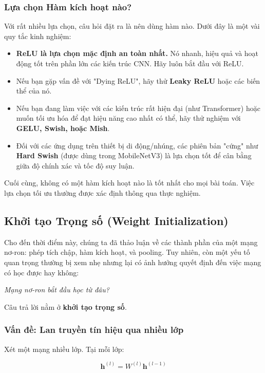 \subsubsection{Lựa chọn Hàm kích hoạt nào?}
Với rất nhiều lựa chọn, câu hỏi đặt ra là nên dùng hàm nào. Dưới đây là một vài quy tắc kinh nghiệm:
\begin{itemize}
	\item \textbf{ReLU là lựa chọn mặc định an toàn nhất.} Nó nhanh, hiệu quả và hoạt động tốt trên phần lớn các kiến trúc CNN. Hãy luôn bắt đầu với ReLU.
	\item Nếu bạn gặp vấn đề với "Dying ReLU", hãy thử \textbf{Leaky ReLU} hoặc các biến thể của nó.
	\item Nếu bạn đang làm việc với các kiến trúc rất hiện đại (như Transformer) hoặc muốn tối ưu hóa để đạt hiệu năng cao nhất có thể, hãy thử nghiệm với \textbf{GELU, Swish, hoặc Mish}.
	\item Đối với các ứng dụng trên thiết bị di động/nhúng, các phiên bản "cứng" như \textbf{Hard Swish} (được dùng trong MobileNetV3) là lựa chọn tốt để cân bằng giữa độ chính xác và tốc độ suy luận.
\end{itemize}
Cuối cùng, không có một hàm kích hoạt nào là tốt nhất cho mọi bài toán. Việc lựa chọn tối ưu thường được xác định thông qua thực nghiệm.

\subsection{Khởi tạo Trọng số (Weight Initialization)}
\label{subsec:weight_initialization}

Cho đến thời điểm này, chúng ta đã thảo luận về các thành phần của một mạng nơ-ron: phép tích chập, hàm kích hoạt, và pooling. Tuy nhiên, còn một yếu tố quan trọng thường bị xem nhẹ nhưng lại có ảnh hưởng quyết định đến việc mạng có học được hay không:

\begin{center}
	\textit{Mạng nơ-ron bắt đầu học từ đâu?}
\end{center}

Câu trả lời nằm ở \textbf{khởi tạo trọng số}.

\subsubsection*{Vấn đề: Lan truyền tín hiệu qua nhiều lớp}

Xét một mạng nhiều lớp. Tại mỗi lớp:

\[
\mathbf{h}^{(l)} = W^{(l)} \mathbf{h}^{(l-1)}
\]

